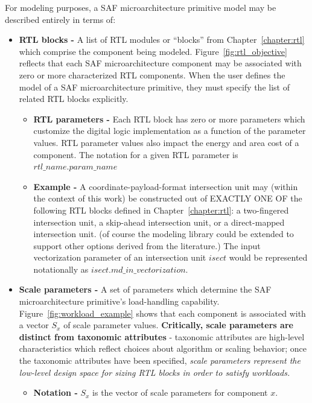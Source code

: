 \clearpage

For modeling purposes, a SAF microarchitecture primitive model may be described entirely in terms of:

\begin{itemize}
    \item \textbf{RTL blocks -} A list of RTL modules or ``blocks'' from Chapter~\ref{chapter:rtl} which comprise the component being modeled. Figure~\ref{fig:rtl_objective} reflects that each SAF microarchitecture component may be associated with zero or more characterized RTL components. When the user defines the model of a SAF microarchitecture primitive, they must specify the list of related RTL blocks explicitly.
    \begin{itemize}
        \item \textbf{RTL parameters -} Each RTL block has zero or more parameters which customize the digital logic implementation as a function of the parameter values. RTL parameter values also impact the energy and area cost of a component. The notation for a given RTL parameter is $rtl\_name.param\_name$
        \item \textbf{Example -} A coordinate-payload-format\cite{sparseloop}\cite{szebook} intersection unit\cite{extensor} may (within the context of this work) be constructed out of EXACTLY ONE OF the following RTL blocks defined in Chapter~\ref{chapter:rtl}: a two-fingered intersection unit\cite{extensor}, a skip-ahead intersection unit\cite{extensor}, or a direct-mapped intersection unit.\cite{extensor} (of course the modeling library could be extended to support other options derived from the literature.) The input vectorization parameter of an intersection unit $isect$ would be represented notationally as $isect.md\_in\_vectorization$.
    \end{itemize}
    \item \textbf{Scale parameters -} A set of parameters which determine the SAF microarchitecture primitive's load-handling capability. Figure~\ref{fig:workload_example} shows that each component is associated with a vector $S_x$ of scale parameter values. \textbf{Critically, scale parameters are distinct from taxonomic attributes} - taxonomic attributes are high-level characteristics which reflect choices about algorithm or scaling behavior; once the taxonomic attributes have been specified, \textit{scale parameters represent the low-level design space for sizing RTL blocks in order to satisfy workloads.}
    \begin{itemize}
        \item \textbf{Notation -} $S_x$ is the vector of scale parameters for component $x$.

\end{itemize}
\end{itemize}
